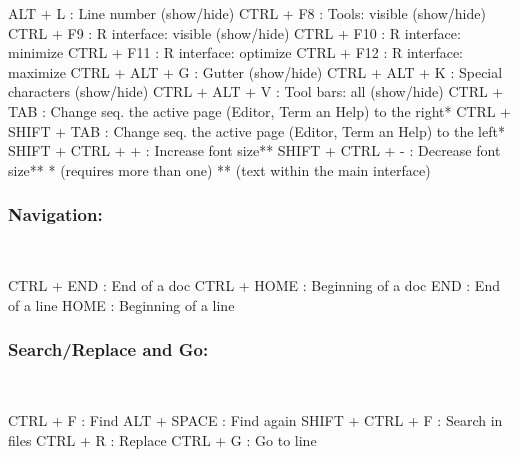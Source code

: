 \vspace{-0.5cm}
\begin{Rtables}[caption={[Visualization keyboard shortcuts]
    Visualization keyboard shortcuts},
  label=hotkey:visualization]
  ALT  + L            : Line number (show/hide)
  CTRL  + F8          : Tools: visible (show/hide)
  CTRL  + F9          : R interface: visible (show/hide)
  CTRL  + F10         : R interface: minimize
  CTRL  + F11         : R interface: optimize
  CTRL  + F12         : R interface: maximize
  CTRL  + ALT  + G    : Gutter (show/hide)
  CTRL  + ALT  + K    : Special characters (show/hide)
  CTRL  + ALT  + V    : Tool bars: all (show/hide)
  CTRL  + TAB         : Change seq. the active page
                        (Editor, Term an Help) to the right*
  CTRL  + SHIFT + TAB : Change seq. the active page
                        (Editor, Term an Help) to the left*
  SHIFT + CTRL + +    : Increase font size**
  SHIFT + CTRL + -    : Decrease font size**
  *  (requires more than one)
  ** (text within the main interface)
\end{Rtables}


\newpage
\subsubsection{Navigation:}\\

\vspace{-0.5cm}
\begin{Rtables}[caption={[Navigation keyboard shortcuts]
    Navigation keyboard shortcuts},
  label=hotkey:navigation]
  CTRL  + END  : End of a doc
  CTRL  + HOME : Beginning of a doc
  END          : End of a line
  HOME         : Beginning of a line
\end{Rtables}

\subsubsection{Search/Replace and Go:}\\

\vspace{-0.5cm}
\begin{Rtables}[caption={[Search/Replace and go keyboard shortcuts]
    Search/Replace and go keyboard shortcuts},
  label=hotkey:search]
  CTRL  + F        : Find
  ALT   + SPACE    : Find again
  SHIFT + CTRL + F : Search in files
  CTRL  + R        : Replace
  CTRL  + G        : Go to line
\end{Rtables}


